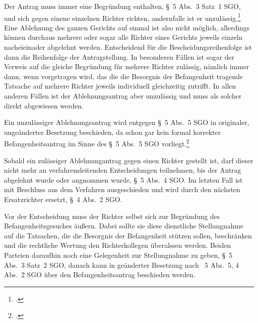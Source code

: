 Der Antrag muss immer eine Begründung enthalten, \S~5 Abs.~3 Satz~1 SGO, und sich gegen einene einzelnen Richter richten, andernfalls ist er unzulässig.\footnote{\cites[S.~1]{BSG201305062BefangenheitI}{BGHIIARZ101}.}
Eine Ablehnung des ganzen Gerichts auf einmal ist also nicht möglich, allerdings können durchaus mehrere oder sogar alle Richter eines Gerichts jeweils einzeln nacheieinader abgelehnt werden.
Entscheidend für die Bescheidungsreihenfolge ist dann die Reihenfolge der Antragstellung.
In besonderen Fällen ist sogar der Verweis auf die gleiche Begründung für mehrere Richter zulässig, nämlich immer dann, wenn vorgetragen wird, das die die Besorgnis der Befangenheit tragende Tatsache auf mehrere Richter jeweils individuell gleichzeitig zutrifft.
In allen anderen Fällen ist der Ablehnungsantrag aber unzulässig und muss als solcher direkt abgewiesen werden.

Ein unzulässiger Ablehnungsantrag wird entgegen \S~5 Abs.~5 SGO in originaler, ungeänderter Besetzung beschieden, da schon gar kein formal korrekter Befangenheitsantrag im Sinne des \S~5 Abs.~5 SGO vorliegt.\footnote{\cites[S.~1]{BSG201305062BefangenheitI}{BSG201305062BefangenheitII}.}

Sobald ein zulässiger Ablehnungantrag gegen einen Richter gestellt ist, darf dieser nicht mehr an verfahrensleitenden Entscheidungen teilnehmen, bis der Antrag abgelehnt wurde oder angnommen wurde, \S~5 Abs.~4 SGO.
Im letzten Fall ist mit Beschluss aus dem Verfahren ausgeschieden und wird durch den nächsten Ersatzrichter ersetzt, \S~4 Abs.~2 SGO.

Vor der Entscheidung muss der Richter selbst sich zur Begründung des Befangenheitsgesuches äußern.
Dabei sollte sie diese dienstliche Stellungnahme auf die Tatsachen, die die Besorgnis der Befangenheit stützen sollen, beschränken und die rechtliche Wertung den Richterkollegen überalssen werden.
Beiden Parteien daraufhin noch eine Gelegenheit zur Stellungnahme zu geben, \S~5 Abs.~3 Satz~2 SGO, danach kann in geänderter Besetzung nach \SSS~5 Abs.~5, 4 Abs.~2 SGO über den Befangenheitsantrag beschieden werden.

